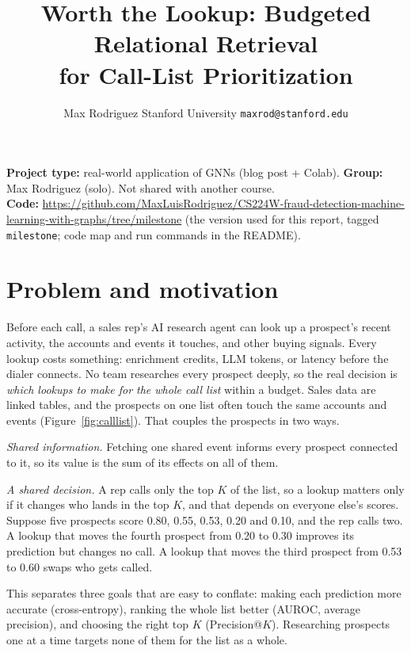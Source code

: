 \documentclass{article}
\title{Worth the Lookup: Budgeted Relational Retrieval\\for Call-List Prioritization}
\author{Max Rodriguez \quad Stanford University \quad \texttt{maxrod@stanford.edu}}
\begin{document}
\maketitle
\vspace{-2em}
\setlength{\abovedisplayskip}{5pt plus 2pt}
\setlength{\belowdisplayskip}{5pt plus 2pt}

\noindent\textbf{Project type:} real-world application of GNNs (blog post + Colab). \textbf{Group:} Max Rodriguez (solo). Not shared with another course.\\
\textbf{Code:} \url{https://github.com/MaxLuisRodriguez/CS224W-fraud-detection-machine-learning-with-graphs/tree/milestone} (the version used for this report, tagged \texttt{milestone}; code map and run commands in the README).

\section{Problem and motivation}

Before each call, a sales rep's AI research agent can look up a prospect's recent activity, the accounts and events it touches, and other buying signals. Every lookup costs something: enrichment credits, LLM tokens, or latency before the dialer connects. No team researches every prospect deeply, so the real decision is \emph{which lookups to make for the whole call list} within a budget. Sales data are linked tables, and the prospects on one list often touch the same accounts and events (Figure~\ref{fig:calllist}). That couples the prospects in two ways.

\emph{Shared information.} Fetching one shared event informs every prospect connected to it, so its value is the sum of its effects on all of them.

\emph{A shared decision.} A rep calls only the top $K$ of the list, so a lookup matters only if it changes who lands in the top $K$, and that depends on everyone else's scores. Suppose five prospects score 0.80, 0.55, 0.53, 0.20 and 0.10, and the rep calls two. A lookup that moves the fourth prospect from 0.20 to 0.30 improves its prediction but changes no call. A lookup that moves the third prospect from 0.53 to 0.60 swaps who gets called.

This separates three goals that are easy to conflate: making each prediction more accurate (cross-entropy), ranking the whole list better (AUROC, average precision), and choosing the right top $K$ (Precision@$K$). Researching prospects one at a time targets none of them for the list as a whole.
\end{document}

